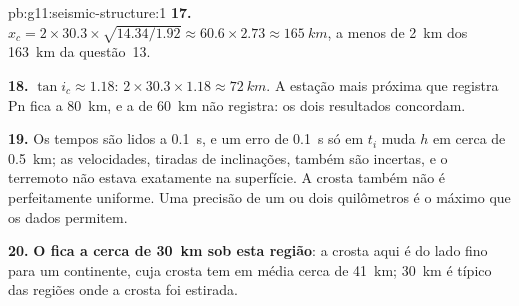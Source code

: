 \begin{solution}{pb:g11:seismic-structure:1}
\textbf{17.} $x_c = 2 \times 30.3 \times \sqrt{14.34/1.92} \approx 60.6 \times
2.73 \approx \qty{165}{km}$, a menos de \qty{2}{km} dos \qty{163}{km} da
questão~13.

\textbf{18.} $\tan i_c \approx 1.18$: $2 \times 30.3 \times 1.18 \approx
\qty{72}{km}$. A estação mais próxima que registra Pn fica a \qty{80}{km}, e
a de \qty{60}{km} não registra: os dois resultados concordam.

\textbf{19.} Os tempos são lidos a \qty{0.1}{s}, e um erro de
\qty{0.1}{s} só em $t_i$ muda $h$ em cerca de \qty{0.5}{km}; as velocidades,
tiradas de inclinações, também são incertas, e o terremoto não estava
exatamente na superfície. A crosta também não é perfeitamente uniforme. Uma
precisão de um ou dois quilômetros é o máximo que os dados permitem.

\textbf{20.} \textbf{O  fica a cerca de \qty{30}{km} sob esta região}:
a crosta aqui é do lado fino para um continente, cuja crosta tem em média
cerca de \qty{41}{km}; \qty{30}{km} é típico das regiões onde a crosta foi
estirada.
\end{solution}
